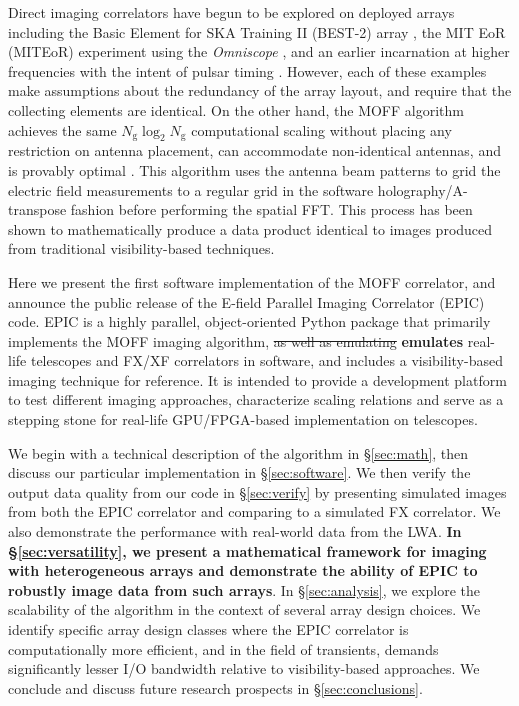 \documentclass[a4paper,fleqn,usenatbib]{mnras}
\newcommand{\Ngrid}{N_\textrm{g}}
\begin{document}
Direct imaging correlators have begun to be explored on deployed arrays including the Basic Element for SKA Training II (BEST-2) array \citep{fos14}, the MIT EoR (MITEoR) experiment \citep{zhe14} using the {\it Omniscope} \citep{teg09,teg10}, and an earlier incarnation at higher frequencies with the intent of pulsar timing \citep{oto94,dai00}. However, each of these examples make assumptions about the redundancy of the array layout, and require that the collecting elements are identical. On the other hand, the MOFF algorithm achieves the same $\Ngrid \log_2 \Ngrid$ computational scaling without placing any restriction on antenna placement, can accommodate non-identical antennas, and is provably optimal \citep{mor11}. This algorithm uses the antenna beam patterns to grid the electric field measurements to a regular grid in the software holography/A-transpose fashion \citep{mor09,bha08,teg97b} before performing the spatial FFT. This process has been shown to mathematically produce a data product identical to images produced from traditional visibility-based techniques.

Here we present the first software implementation of the MOFF correlator, and announce the public release of the E-field Parallel Imaging Correlator (EPIC) code. EPIC is a highly parallel, object-oriented Python package that primarily implements the MOFF imaging algorithm, \sout{as well as emulating} {\bf emulates} real-life telescopes and FX/XF correlators in software, and includes a visibility-based imaging technique for reference. It is intended to provide a development platform to test different imaging approaches, characterize scaling relations and serve as a stepping stone for real-life GPU/FPGA-based implementation on telescopes.

We begin with a technical description of the algorithm in \S\ref{sec:math}, then discuss our particular implementation in \S\ref{sec:software}. We then verify the output data quality from our code in \S\ref{sec:verify} by presenting simulated images from both the EPIC correlator and comparing to a simulated FX correlator. We also demonstrate the performance with real-world data from the LWA. {\bf In \S\ref{sec:versatility}, we present a mathematical framework for imaging with heterogeneous arrays and demonstrate the ability of EPIC to robustly image data from such arrays}. In \S\ref{sec:analysis}, we explore the scalability of the algorithm in the context of several array design choices. We identify specific array design classes where the EPIC correlator is computationally more efficient, and in the field of transients, demands significantly lesser I/O bandwidth relative to visibility-based approaches. We conclude and discuss future research prospects in \S\ref{sec:conclusions}.
\end{document}
